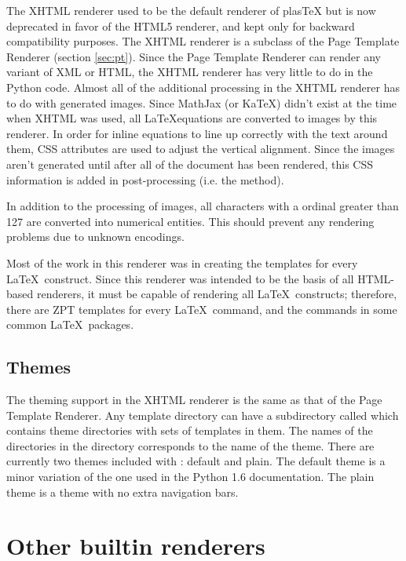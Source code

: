The XHTML renderer used to be the default renderer of plasTeX but is now
deprecated in favor of the HTML5 renderer, and kept only for
backward compatibility purposes.
The XHTML renderer is a subclass of the Page Template Renderer (section
\ref{sec:pt}). Since the Page Template Renderer can render any variant
of XML or HTML, the XHTML renderer has very little to do in the Python
code. Almost all of the additional processing in the XHTML renderer has
to do with generated images.
Since MathJax (or KaTeX) didn't exist at the time when XHTML was used,
all \LaTeX equations are converted to images by this renderer. In order
for inline equations to line up correctly with the text around them, CSS
attributes are used to adjust the vertical alignment.  Since the images
aren't generated until after all of the document has been rendered, this
CSS information is added in post-processing (i.e. the 
method).

In addition to the processing of images, all characters with a ordinal
greater than 127 are converted into numerical entities.  This should
prevent any rendering problems due to unknown encodings.

Most of the work in this renderer was in creating the templates for
every \LaTeX\ construct.  Since this renderer was intended to be the
basis of all HTML-based renderers, it must be capable of rendering
all \LaTeX\ constructs; therefore, there are ZPT templates for every
\LaTeX\ command, and the commands in some common \LaTeX\ packages.

\subsection{Themes}

The theming support in the XHTML renderer is the same as that of the
Page Template Renderer.  Any template directory can have a subdirectory called
 which contains theme directories with sets of templates
in them.  The names of the directories in the  directory
corresponds to the name of the theme.  There are currently two themes
included with \plasTeX: default and plain.  The default theme is a
minor variation of the one used in the Python 1.6 documentation.  The
plain theme is a theme with no extra navigation bars.

\section{Other builtin renderers}

